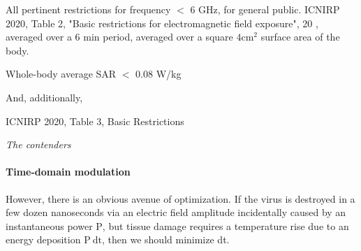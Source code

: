 \documentclass[fleqn,10pt]{article}
\begin{document}
%

All pertinent restrictions for frequency $<$ 6 GHz, for general public.
ICNIRP 2020, Table 2, "Basic restrictions for electromagnetic field exposure",
20 \Wsqm, averaged over a 6 min period, averaged over a square $4 \text{cm}^2$ surface area of the body.

Whole-body average SAR $<$ 0.08 W/kg

And, additionally, 

ICNIRP 2020, Table 3, Basic Restrictions


\clearpage
{\Large \it The contenders}\\



\clearpage



\paragraph{Time-domain modulation}

However, there is an obvious avenue of optimization. If the virus is destroyed in a few dozen nanoseconds via an electric field amplitude incidentally caused by an instantaneous power $\text{P}$, but tissue damage requires a temperature rise due to an energy deposition $\text{P} \  \text{dt}$, then we should minimize dt.\
\end{document}
